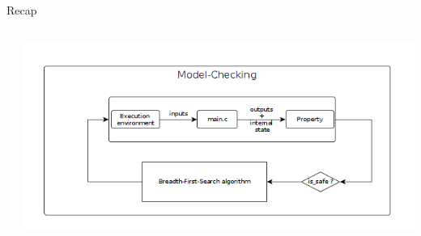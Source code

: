 \documentclass{beamer}
\begin{document}
\begin{frame}{Recap}
\begin{columns}
\begin{itemize}
	\end{itemize}
	\includegraphics[width=\textwidth]{Figures/sumup_MC}
\end{columns}


\end{frame}
\end{document}
